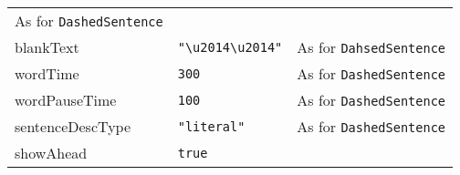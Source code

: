 \documentclass[
]{article}
\begin{document}
\begin{RaggedRight}
\begin{longtable}[]{p{1.7in}p{1in}p{3.15in}}
\begin{minipage}[t]{0.49\columnwidth}
As for \texttt{DashedSentence}\strut
\end{minipage}\tabularnewline
\begin{minipage}[t]{0.17\columnwidth}\raggedright
blankText\strut
\end{minipage} & \begin{minipage}[t]{0.25\columnwidth}\raggedright
\texttt{"\textbackslash{}u2014\textbackslash{}u2014"}\strut
\end{minipage} & \begin{minipage}[t]{0.49\columnwidth}\raggedright
As for \texttt{DahsedSentence}\strut
\end{minipage}\tabularnewline
\begin{minipage}[t]{0.17\columnwidth}\raggedright
wordTime\strut
\end{minipage} & \begin{minipage}[t]{0.25\columnwidth}\raggedright
\texttt{300}\strut
\end{minipage} & \begin{minipage}[t]{0.49\columnwidth}\raggedright
As for \texttt{DashedSentence}\strut
\end{minipage}\tabularnewline
\begin{minipage}[t]{0.17\columnwidth}\raggedright
wordPauseTime\strut
\end{minipage} & \begin{minipage}[t]{0.25\columnwidth}\raggedright
\texttt{100}\strut
\end{minipage} & \begin{minipage}[t]{0.49\columnwidth}\raggedright
As for \texttt{DashedSentence}\strut
\end{minipage}\tabularnewline
\begin{minipage}[t]{0.17\columnwidth}\raggedright
sentenceDescType\strut
\end{minipage} & \begin{minipage}[t]{0.25\columnwidth}\raggedright
\texttt{"literal"}\strut
\end{minipage} & \begin{minipage}[t]{0.49\columnwidth}\raggedright
As for \texttt{DashedSentence}\strut
\end{minipage}\tabularnewline
\begin{minipage}[t]{0.17\columnwidth}\raggedright
showAhead\strut
\end{minipage} & \begin{minipage}[t]{0.25\columnwidth}\raggedright
\texttt{true}\strut
\end{minipage} & \begin{minipage}[t]{0.49\columnwidth}\raggedright

\end{minipage}
\end{longtable}
\end{RaggedRight}
\end{document}

